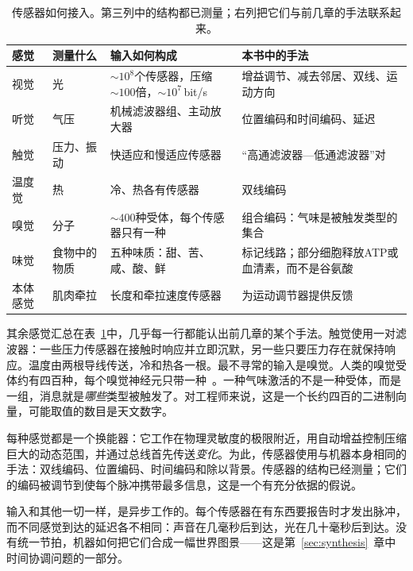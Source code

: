 \begin{table}[t]
\centering
\footnotesize
\setlength{\tabcolsep}{3pt}
\renewcommand{\arraystretch}{1.15}
\begin{tabular}{>{\raggedright}p{1.9cm}>{\raggedright}p{2.6cm}>{\raggedright}p{4.0cm}>{\raggedright\arraybackslash}p{4.6cm}}
\toprule
感觉 & 测量什么 & 输入如何构成 & 本书中的手法 \\
\midrule
视觉 & 光 & $\sim10^8$个传感器，压缩$\sim100$倍，$\sim10^7$\,bit/s & 增益调节、减去邻居、双线、运动方向 \\
听觉 & 气压 & 机械滤波器组、主动放大器 & 位置编码和时间编码、延迟 \\
触觉 & 压力、振动 & 快适应和慢适应传感器 & “高通滤波器—低通滤波器”对 \\
温度觉 & 热 & 冷、热各有传感器 & 双线编码 \\
嗅觉 & 分子 & $\sim400$种受体，每个传感器只有一种 & 组合编码：气味是被触发类型的集合 \\
味觉 & 食物中的物质 & 五种味质：甜、苦、咸、酸、鲜 & 标记线路；部分细胞释放ATP或血清素，而不是谷氨酸 \\
本体感觉 & 肌肉牵拉 & 长度和牵拉速度传感器 & 为运动调节器提供反馈 \\
\bottomrule
\end{tabular}
\caption{传感器如何接入。第三列中的结构都已测量；右列把它们与前几章的手法联系起来。}
\label{tab:sensors}
\end{table}

其余感觉汇总在表~\ref{tab:sensors}中，几乎每一行都能认出前几章的某个手法。触觉使用一对滤波器：一些压力传感器在接触时响应并立即沉默，另一些只要压力存在就保持响应。温度由两根导线传送，冷和热各一根。最不寻常的输入是嗅觉。人类的嗅觉受体约有四百种，每个嗅觉神经元只带一种~\cite{Mombaerts2004}。一种气味激活的不是一种受体，而是一组，消息就是\emph{哪些}类型被触发了。对工程师来说，这是一个长约四百的二进制向量，可能取值的数目是天文数字。

\begin{keyblock}
\begin{proposition}[机器的输入]
\label{prop:sensors}
每种感觉都是一个换能器：它工作在物理灵敏度的极限附近，用自动增益控制压缩巨大的动态范围，并通过总线首先传送\emph{变化}。为此，传感器使用与机器本身相同的手法：双线编码、位置编码、时间编码和除以背景。传感器的结构已经测量；它们的编码被调节到使每个脉冲携带最多信息，这是一个有充分依据的假说。
\end{proposition}
\end{keyblock}

输入和其他一切一样，是异步工作的。每个传感器在有东西要报告时才发出脉冲，而不同感觉到达的延迟各不相同：声音在几毫秒后到达，光在几十毫秒后到达。没有统一节拍，机器如何把它们合成一幅世界图景——这是第~\ref{sec:synthesis}~章中时间协调问题的一部分。

